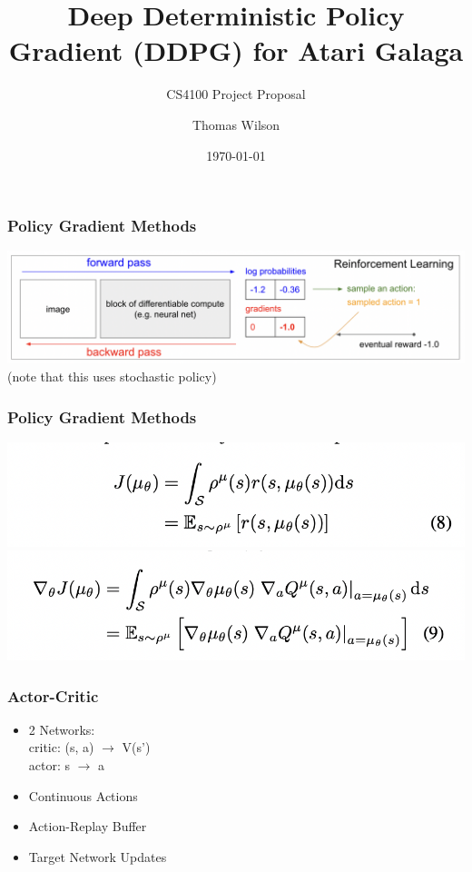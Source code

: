 \documentclass{beamer}
\title{Deep Deterministic Policy Gradient (DDPG) for Atari Galaga}
\subtitle{CS4100 Project Proposal}
\author{Thomas Wilson}
\institute{Khoury College of Computer Sciences}
\date{\today}
\begin{document}
\begin{frame}
	\titlepage
\end{frame}

\begin{frame}
	\frametitle{Policy Gradient Methods}
	\center 
	\includegraphics[width=1\textwidth]{policygrad.png} \\
	(note that this uses stochastic policy) 
\end{frame}

\begin{frame}
	\frametitle{Policy Gradient Methods}
	\center 
	\includegraphics[width=1\textwidth]{performance.png} \\
	\includegraphics[width=1\textwidth]{gradient.png}
\end{frame}

\begin{frame}
	\frametitle{Actor-Critic}
	\begin{itemize}
		\item 2 Networks: \\ 
			critic: (s, a) $\rightarrow$ V(s') \\
			actor: s $\rightarrow$ a \\
		\item Continuous Actions \\
		\item Action-Replay Buffer \\
		\item Target Network Updates
	\end{itemize}
\end{frame}
\end{document}
